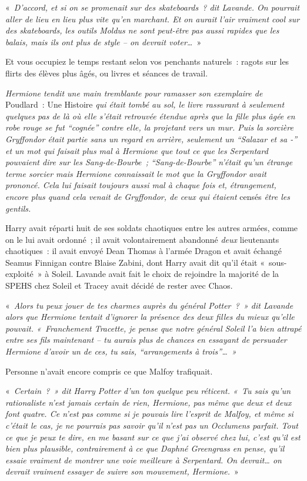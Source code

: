 «~\emph{D'accord, et si on se promenait sur des skateboards~? dit Lavande. On pourrait aller de lieu en lieu plus vite qu'en marchant. Et on aurait l'air vraiment cool sur des skateboards, les outils Moldus ne sont peut-être pas aussi rapides que les balais, mais ils ont plus de style -- on devrait voter…}~»

Et vous occupiez le temps restant selon vos penchants naturels~: ragots sur les flirts des élèves plus âgés, ou livres et séances de travail.

\emph{Hermione tendit une main tremblante pour ramasser son exemplaire de} Poudlard~: Une Histoire \emph{qui était tombé au sol, le livre rassurant à seulement quelques pas de là où elle s'était retrouvée étendue après que la fille plus âgée en robe rouge se fut “cognée” contre elle, la projetant vers un mur. Puis la sorcière Gryffondor était partie sans un regard en arrière, seulement un “Salazar et sa -” et un mot qui faisait plus mal à Hermione que tout ce que les Serpentard pouvaient dire sur les Sang-de-Bourbe~; “Sang-de-Bourbe” n'était qu'un étrange terme sorcier mais Hermione connaissait le mot que la Gryffondor avait prononcé. Cela lui faisait toujours aussi mal à chaque fois et, étrangement, encore plus quand cela venait de Gryffondor, de ceux qui étaient} censés \emph{être les gentils.}

Harry avait réparti huit de ses soldats chaotiques entre les autres armées, comme on le lui avait ordonné~; il avait volontairement abandonné \emph{deux} lieutenants chaotiques~: il avait envoyé Dean Thomas à l'armée Dragon et avait échangé Seamus Finnigan contre Blaise Zabini, dont Harry avait dit qu'il était «~sous-exploité~» à Soleil. Lavande avait fait le choix de rejoindre la majorité de la SPEHS chez Soleil et Tracey avait décidé de rester avec Chaos.

«~\emph{Alors tu peux jouer de tes charmes auprès du général Potter~?~» dit Lavande alors que Hermione tentait d'ignorer la présence des deux filles du mieux qu'elle pouvait. «~Franchement Tracette, je pense que notre général Soleil l'a bien attrapé entre ses fils maintenant -- tu aurais plus de chances en essayant de persuader Hermione d'avoir un de ces, tu sais, “arrangements à trois”…~»}

Personne n'avait encore compris ce que Malfoy trafiquait.

«~\emph{Certain~?~» dit Harry Potter d'un ton quelque peu réticent. «~Tu sais qu'un rationaliste n'est jamais certain de rien, Hermione, pas même que deux et deux font quatre. Ce n'est pas comme si je pouvais lire l'esprit de Malfoy, et même si c'était le cas, je ne pourrais pas savoir qu'il n'est pas un Occlumens parfait. Tout ce que je peux te dire, en me basant sur ce que j'ai observé chez lui, c'est qu'il est bien plus plausible, contrairement à ce que Daphné Greengrass en pense, qu'il essaie vraiment de montrer une voie meilleure à Serpentard. On devrait… on devrait vraiment essayer de suivre son mouvement, Hermione.}~»

